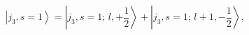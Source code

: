 \begin{equation}
\left| j_{3},s=1\right\rangle =\left| j_{3},s=1;\,l,+\frac{1}{2}%
\right\rangle +\left| j_{3},s=1;\,l+1,-\frac{1}{2}\right\rangle ,
\label{eq40}
\end{equation}

